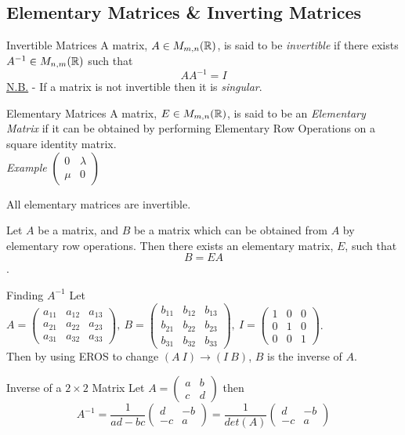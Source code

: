 \documentclass[11pt,a4paper]{article}
\begin{document}
\subsection{Elementary Matrices \& Inverting Matrices}
%
\subtitle{Definition 3.22 - }{Invertible Matrices}
A matrix, $A \in M_{m,n}(\mathbb{R})$, is said to be \textit{invertible} if there exists $A^{-1} \in M_{n,m}(\mathbb{R})$ such that
$$AA^{-1} = I$$
\underline{N.B.} - If a matrix is not invertible then it is \textit{singular}.\\

\subtitle{Definition 3.23 - }{Elementary Matrices}
A matrix, $E \in M_{m,n}(\mathbb{R})$, is said to be an \textit{Elementary Matrix} if it can be obtained by performing Elementary Row Operations on a square identity matrix.\\
\textit{Example}
$\begin{pmatrix}
  0 & \lambda \\
  \mu & 0
\end{pmatrix}$ \\

\subtitle{Remark 3.24}{}
All elementary matrices are invertible.

\subtitle{Remark 3.25}{}
Let $A$ be a matrix, and $B$ be a matrix which can be obtained from $A$ by elementary row operations. Then there exists an elementary matrix, $E$, such that $$B = EA$$.

\subtitle{Theorem 3.26 - }{Finding $A^{-1}$}
Let $A = \begin{pmatrix}
  a_{11} & a_{12} & a_{13} \\
  a_{21} & a_{22} & a_{23} \\
  a_{31} & a_{32} & a_{33}
\end{pmatrix},\ B = \begin{pmatrix}
  b_{11} & b_{12} & b_{13} \\
  b_{21} & b_{22} & b_{23} \\
  b_{31} & b_{32} & b_{33}
\end{pmatrix},\ I = \begin{pmatrix}
  1 & 0 & 0 \\
  0 & 1 & 0 \\
  0 & 0 & 1
\end{pmatrix}$. \\
Then by using EROS to change $(A\ I) \to (I\ B)$, $B$ is the inverse of $A$. \\

\subtitle{Theorem 3.27 - }{Inverse of a $2 \times 2$ Matrix}
Let $A = \begin{pmatrix}
  a & b \\
  c & d
\end{pmatrix}$ then $$A^{-1} = \frac{1}{ad - bc} \begin{pmatrix}
  d & -b \\
  -c & a
\end{pmatrix} = \frac{1}{det(A)} \begin{pmatrix}
  d & -b \\
  -c & a
\end{pmatrix} $$
\end{document}
